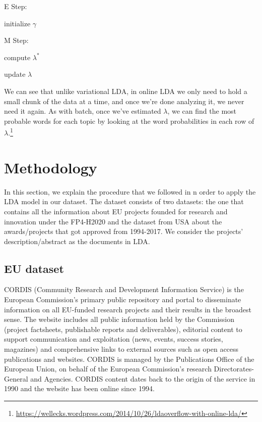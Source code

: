 \documentclass[12pt]{report}
\begin{document}
\begin{algorithm}
\SetAlgoNoLine
E Step:

initialize $\gamma$

M Step:

compute $\lambda^{*}$

update $\lambda$
\end{algorithm}

We can see that unlike variational LDA, in online LDA we only need to hold a
small chunk of the data at a time, and once we’re done analyzing it, we never
need it again. As with batch, once we’ve estimated $\lambda$, we can find the 
most probable words for each topic by looking at the word probabilities in 
each row of $\lambda$.\footnote{\url{https://wellecks.wordpress.com/2014/10/26/ldaoverflow-with-online-lda/}}

\section{Methodology}

In this section, we explain the procedure that we followed in n order to apply
the LDA model in our dataset. The dataset consists of two datasets: the one that
contains all the information about EU projects founded for research and
innovation under the FP4-H2020 and the dataset from USA about the
awards/projects that got approved from 1994-2017. We consider the projects'
description/abstract as the documents in LDA. 

\subsection{EU dataset}

CORDIS (Community Research and Development Information Service) is the European
Commission's primary public repository and portal to disseminate information on
all EU-funded research projects and their results in the broadest sense. The
website includes all public information held by the Commission (project
factsheets, publishable reports and deliverables), editorial content to support
communication and exploitation (news, events, success stories, magazines) and
comprehensive links to external sources such as open access publications and
websites. CORDIS is managed by the Publications Office of the European Union, on
behalf of the European Commission's research Directorates-General and Agencies.
CORDIS content dates back to the origin of the service in 1990 and the website
has been online since 1994.
\end{document}
